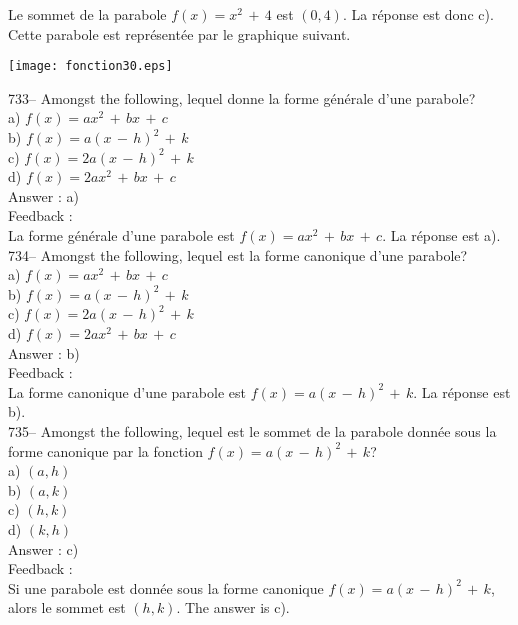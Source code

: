 \documentclass[letterpaper, 12pt]{article}
\begin{document}
Le sommet de la parabole $f\left( x\right) =x^{2}\,+\,4$ est $(0,4)$.  La
r\'eponse est donc c).  Cette parabole est repr\'esent\'ee par le graphique
suivant.\\
    \begin{center}
    \texttt{[image: fonction30.eps]}
    \end{center}

733-- Amongst the following, lequel donne la forme g\'en\'erale
d'une parabole?\\
a) $f(x)=ax^{2}\,+\,bx\,+\,c$\\
b) $f(x)=a(x\,-\,h)^{2}\,+\,k$\\
c) $f(x)=2a(x\,-\,h)^{2}\,+\,k$\\
d) $f(x)=2ax^{2}\,+\,bx\,+\,c$\\

Answer : a)\\

Feedback : \\
La forme g\'en\'erale d'une parabole est $f(x)=ax^{2}\,+\,bx\,+\,c$.  La
r\'eponse est a).\\

734-- Amongst the following, lequel est la forme canonique d'une
parabole?\\
a) $f(x)=ax^{2}\,+\,bx\,+\,c$\\
b) $f(x)=a(x\,-\,h)^{2}\,+\,k$\\
c) $f(x)=2a(x\,-\,h)^{2}\,+\,k$\\
d) $f(x)=2ax^{2}\,+\,bx\,+\,c$\\

Answer : b)\\

Feedback : \\
La forme canonique d'une parabole est $f(x)=a(x\,-\,h)^{2}\,+\,k$.  La
r\'eponse est b).\\

735-- Amongst the following, lequel est le sommet de la parabole
donn\'ee sous la forme canonique par la fonction
$f(x)=a(x\,-\,h)^{2}\,+\,k$?\\
a) $(a,h)$\\
b) $(a,k)$\\
c) $(h,k)$\\
d) $(k,h)$\\

Answer : c)\\

Feedback : \\
Si une parabole est donn\'ee sous la forme canonique
$f(x)=a(x\,-\,h)^{2}\,+\,k$, alors le sommet est $(h,k)$.  The answer is
c).\\
\end{document}
